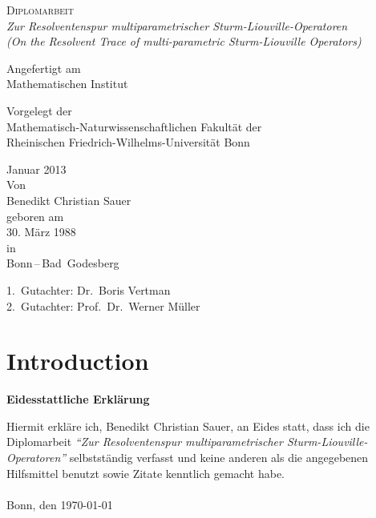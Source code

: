 \documentclass[paper=a4,twoside,parskip=full]{scrartcl}
\author{Benedikt Christian Sauer}
\title{\Thema}
\numberwithin{equation}{section}
\numberwithin{Corollary}{section}
\numberwithin{Lemma}{section}
\numberwithin{Theorem}{section}
\newcommand{\Thema}{Zur Resolventenspur multiparametrischer
Sturm-Liouville-Operatoren}
\newcommand{\ThemaEn}{On the Resolvent Trace of multi-parametric Sturm-Liouville
Operators}
\begin{document}
\begin{titlepage}
  \begin{center}
      \textsc{Diplomarbeit} \\
      \bigskip
      \textit{\Thema} \\
      \textit{(\ThemaEn)}
  \end{center}
  \begin{center}
      Angefertigt am \\
      Mathematischen Institut
  \end{center}
  \begin{center}
      Vorgelegt der \\
      Mathematisch-Naturwissenschaftlichen Fakultät der \\
      Rheinischen Friedrich-Wilhelms-Universität Bonn
  \end{center}
  \begin{center}
      Januar 2013 \\
      \bigskip
      Von \\
      \bigskip
      Benedikt Christian Sauer \\
      \bigskip
      geboren am \\
      30. März 1988 \\
      in \\
      Bonn\,--\,Bad~Godesberg
  \end{center}
\end{titlepage}
\newpage
\tableofcontents
\vfill
\begin{center}
  \large 1.\ Gutachter: Dr.\ Boris Vertman \\
  \large 2.\ Gutachter: Prof.\ Dr.\ Werner Müller
\end{center}
\newpage
\section{Introduction}


\setcounter{MainTheorem}{0}









\appendix


\newpage

\newpage
{}
\pagestyle{plain}
\begin{center}
    \textbf{\large Eidesstattliche Erklärung}
\end{center}
\vspace{2cm}
Hiermit erkläre ich, Benedikt Christian Sauer, an Eides statt, dass ich die
Diplomarbeit \textit{"`\Thema"'} selbstständig verfasst und keine anderen als
die angegebenen Hilfsmittel benutzt sowie Zitate kenntlich gemacht habe. \\
\vspace{2cm} \\
Bonn, den \today
\end{document}
